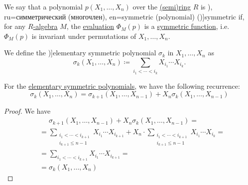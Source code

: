 \begin{definition}\label{def:symmetric_polynomial}
  We say that a polynomial \( p(X_1, \ldots, X_n) \) over the \hyperref[def:semiring]{(semi)ring} \( R \) is \term[bg=симетричен (полином) (\cite[58]{ГеновМиховскиМоллов1991Алгебра}), ru=симметрический (многочлен), en=symmetric (polynomial) (\cite[190]{Lang2002Algebra})]{symmetric} if, for any \hyperref[def:algebra_over_semiring]{\( R \)-algebra} \( M \), the \hyperref[con:evaluation_homomorphism]{evaluation} \( \Phi_M(p) \) is a \hyperref[def:symmetric_function]{symmetric function}, i.e. \( \Phi_M(p) \) is invariant under permutations of \( X_1, \ldots, X_n \).
\end{definition}

\begin{definition}\label{def:elementary_symmetric_polynomial}
  We define the \term[ru=элементарный симметрический многочлен, en=elementary symmetric polynomial (\cite[190]{Lang2002Algebra})]{elementary symmetric polynomial} \( \sigma_k \) in \( X_1, \ldots, X_n \) as
  \begin{equation}\label{eq:def:elementary_symmetric_polynomial}
    \sigma_k(X_1, \ldots, X_n) \coloneqq \sum_{i_1 < \cdots < i_k} X_{i_1} \cdots X_{i_k}.
  \end{equation}
\end{definition}

\begin{lemma}\label{thm:symmetric_polynomial_recurrence}
  For the \hyperref[def:elementary_symmetric_polynomial]{elementary symmetric polynomials}, we have the following recurrence:
  \begin{equation}\label{eq:thm:symmetric_polynomial_recurrence}
    \sigma_k(X_1, \ldots, X_n) = \sigma_{k+1}(X_1, \ldots, X_{n-1}) + X_n \sigma_k(X_1, \ldots, X_{n-1})
  \end{equation}
\end{lemma}
\begin{proof}
  We have
  \begin{align*}
    &\phantom{{}={}}
    \sigma_{k+1}(X_1, \ldots, X_{n-1}) + X_n \sigma_k(X_1, \ldots, X_{n-1})
    = \\ &=
    \sum_{\substack{i_1 < \cdots < i_{k+1} \\ i_{k+1} \leq n - 1}} X_{i_1} \cdots X_{i_{k+1}} + X_n \cdot \sum_{\substack{i_1 < \cdots < i_{k+1} \\ i_{k+1} \leq n - 1}} X_{i_1} \cdots X_{i_k}
    = \\ &=
    \sum_{i_1 < \cdots < i_{k+1}} X_{i_1} \cdots X_{i_{k+1}}
    = \\ &=
    \sigma_k(X_1, \ldots, X_n)
  \end{align*}
\end{proof}

